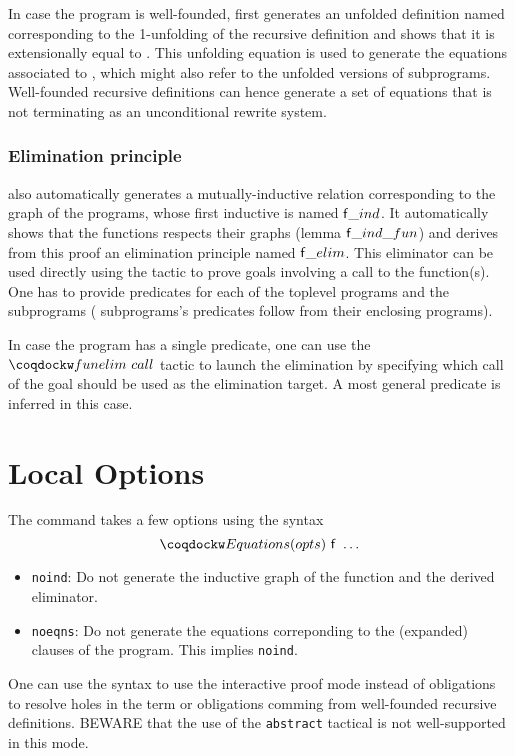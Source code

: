 In case the program is well-founded, \Equations first generates an
unfolded definition named  corresponding to the
1-unfolding of the recursive definition and shows that it is
extensionally equal to . This unfolding equation is used
to generate the equations associated to , which might also
refer to the unfolded versions of subprograms. Well-founded
recursive definitions can hence generate a set of equations that
is not terminating as an unconditional rewrite system.

\subsubsection{Elimination principle}

\Equations also automatically generates a mutually-inductive relation
corresponding to the graph of the programs, whose first inductive is named
$\mbox{\textsf{f}}\_ind$. It automatically shows that the functions respects their
graphs (lemma $\mbox{\textsf{f}}\_ind\_fun$) and derives from this proof an
elimination principle named $\mbox{\textsf{f}}\_elim$. This eliminator can be used
directly using the  tactic to prove goals involving a call to
the function(s). One has to provide predicates for each of the toplevel
programs and the  subprograms ( subprograms's
predicates follow from their enclosing programs).

In case the program has a single predicate, one can use the
$\tac{funelim}~call$ tactic to launch the elimination by specifying
which call of the goal should be used as the elimination target.
A most general predicate is inferred in this case.

\section{Local Options}
The  command takes a few options using the syntax
\[\kw{Equations}(opts)~\cst{f}~\ldots\]

\begin{itemize}
\item \texttt{noind}: Do not generate the inductive graph of the
  function and the derived eliminator.
\item \texttt{noeqns}: Do not generate the equations correponding to the
  (expanded) clauses of the program. This implies \texttt{noind}.
\end{itemize}

One can use the  syntax to use the interactive proof mode
instead of obligations to resolve holes in the term or obligations
comming from well-founded recursive definitions. BEWARE that the use
of the \texttt{abstract} tactical is not well-supported in this mode.

